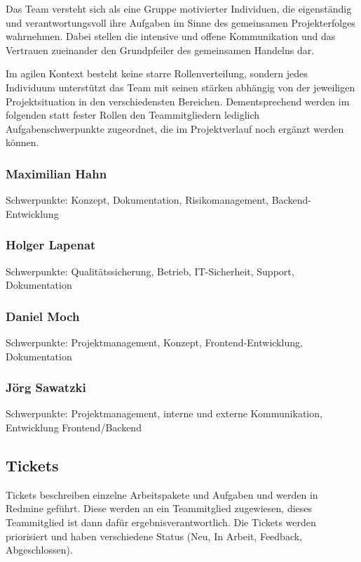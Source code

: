 \documentclass[a4paper,11pt,listof=numbered,glossary=totoc,parskip=half,toc=bib]{scrreprt}
\begin{document}
Das Team versteht sich als eine Gruppe motivierter Individuen, die eigenständig und verantwortungsvoll ihre Aufgaben im Sinne des gemeinsamen Projekterfolges wahrnehmen. Dabei stellen die intensive und offene Kommunikation und das Vertrauen zueinander den Grundpfeiler des gemeinsamen Handelns dar.

Im agilen Kontext besteht keine starre Rollenverteilung, sondern jedes Individuum unterstützt das Team mit seinen stärken abhängig von der jeweiligen Projektsituation in den verschiedensten Bereichen.
Dementsprechend werden im folgenden statt fester Rollen den Teammitgliedern lediglich Aufgabenschwerpunkte zugeordnet, die im Projektverlauf noch ergänzt werden können.

\subsubsection{Maximilian Hahn}

Schwerpunkte: Konzept, Dokumentation, Risikomanagement, Backend-Entwicklung

\subsubsection{Holger Lapenat}

Schwerpunkte: Qualitätssicherung, Betrieb, IT-Sicherheit, Support, Dokumentation

\subsubsection{Daniel Moch}

Schwerpunkte: Projektmanagement, Konzept, Frontend-Entwicklung, Dokumentation

\subsubsection{Jörg Sawatzki}

Schwerpunkte: Projektmanagement, interne und externe Kommunikation, Entwicklung Frontend/Backend


\subsection{Tickets}

Tickets beschreiben einzelne Arbeitspakete und Aufgaben und werden in Redmine geführt. Diese werden an ein Teammitglied zugewiesen, dieses Teammitglied ist dann dafür ergebnisverantwortlich. Die Tickets werden priorisiert und haben verschiedene Status (Neu, In Arbeit, Feedback, Abgeschlossen).
\end{document}
